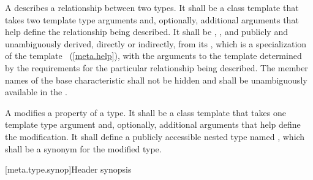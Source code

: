 \pnum
A  describes a
relationship between two types. It shall be a class template that
takes two template type arguments and, optionally, additional
arguments that help define the relationship being described. It shall
be , ,
and publicly and unambiguously derived, directly or
indirectly, from
its , which is a specialization
of the template
~(\ref{meta.help}), with
the arguments to the template  determined by the
requirements for the particular relationship being described.
The member names of the base characteristic shall not be hidden and shall be
unambiguously available in the .

\pnum
A 
modifies a property
of a type. It shall be a class template that takes one
template type argument and, optionally, additional arguments that help
define the modification. It shall define a publicly accessible nested type
named , which shall be a synonym for the modified type.

[meta.type.synop]{Header  synopsis}

